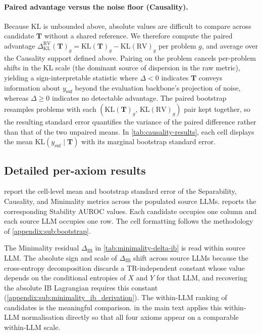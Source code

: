 \paragraph{Paired advantage versus the noise floor (Causality).}
Because $\mathrm{KL}$ is unbounded above, absolute values are difficult to
compare across candidate $\mathbf{T}$ without a shared reference. We
therefore compute the paired advantage $\Delta^{\mathrm{RV}}_{\mathrm{KL}}(\mathbf{T})_g = \mathrm{KL}(\mathbf{T})_g - \mathrm{KL}(\mathrm{RV})_g$ per problem $g$, and average over the Causality support defined above.
Pairing on the problem cancels per-problem shifts in the KL scale (the
dominant source of dispersion in the raw metric), yielding a
sign-interpretable statistic where $\Delta < 0$ indicates $\mathbf{T}$ conveys
information about $y_{\mathrm{suf}}$ beyond the evaluation backbone's projection of noise,
whereas $\Delta \geq 0$ indicates no detectable advantage. The paired
bootstrap resamples problems with each
$(\mathrm{KL}(\mathbf{T})_g,\,\mathrm{KL}(\mathrm{RV})_g)$ pair kept
together, so the resulting standard error quantifies the variance of the
paired difference rather than that of the two unpaired means.
In \cref{tab:causality-results}, each cell displays the mean
$\mathrm{KL}(y_{\mathrm{suf}} \mid \mathbf{T})$ with its marginal bootstrap standard
error.

\subsection{Detailed per-axiom results}
\label{appendix:sub:detailed_results}

report the cell-level mean and bootstrap standard error of the
Separability, Causality, and Minimality metrics across the populated
source LLMs.  reports the corresponding
Stability AUROC values. Each candidate occupies one column and each
source LLM occupies one row. The cell formatting follows the
methodology of \cref{appendix:sub:bootstrap}.







The Minimality residual $\Delta_{\text{IB}}$ in
\cref{tab:minimality-delta-ib} is read within source LLM. The absolute
sign and scale of $\Delta_{\text{IB}}$ shift across source LLMs because
the cross-entropy decomposition discards a TR-independent constant
whose value depends on the conditional entropies of $X$ and $Y$ for
that LLM, and recovering the absolute IB Lagrangian requires this
constant (\cref{appendix:sub:minimality_ib_derivation}).
The within-LLM ranking of candidates is the meaningful comparison.
 in the main text applies this within-LLM
normalisation directly so that all four axioms appear on a comparable
within-LLM scale.

